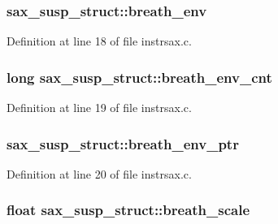 \subsubsection[{\texorpdfstring{breath\+\_\+env}{breath_env}}]{ sax\+\_\+susp\+\_\+struct\+::breath\+\_\+env}\hypertarget{structsax__susp__struct_a25cb1bf8bed4c0239f37266de6de33d2}{}\label{structsax__susp__struct_a25cb1bf8bed4c0239f37266de6de33d2}


Definition at line 18 of file instrsax.\+c.

\subsubsection[{\texorpdfstring{breath\+\_\+env\+\_\+cnt}{breath_env_cnt}}]{\setlength{\rightskip}{0pt plus 5cm}long sax\+\_\+susp\+\_\+struct\+::breath\+\_\+env\+\_\+cnt}\hypertarget{structsax__susp__struct_adc09a4c8d9033f24e8c3b3312b657cb3}{}\label{structsax__susp__struct_adc09a4c8d9033f24e8c3b3312b657cb3}


Definition at line 19 of file instrsax.\+c.

\subsubsection[{\texorpdfstring{breath\+\_\+env\+\_\+ptr}{breath_env_ptr}}]{ sax\+\_\+susp\+\_\+struct\+::breath\+\_\+env\+\_\+ptr}\hypertarget{structsax__susp__struct_a64656bbf5a2ad87ef353766edc354f4d}{}\label{structsax__susp__struct_a64656bbf5a2ad87ef353766edc354f4d}


Definition at line 20 of file instrsax.\+c.

\subsubsection[{\texorpdfstring{breath\+\_\+scale}{breath_scale}}]{\setlength{\rightskip}{0pt plus 5cm}float sax\+\_\+susp\+\_\+struct\+::breath\+\_\+scale}\hypertarget{structsax__susp__struct_aeaf89a78a654e03afc6e5f659c3a72ce}{}\label{structsax__susp__struct_aeaf89a78a654e03afc6e5f659c3a72ce}


